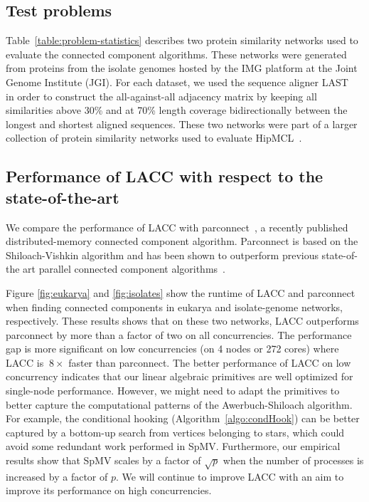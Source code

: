 \subsection{Test problems} 
Table~\ref{table:problem-statistics} describes two protein similarity networks used to evaluate the connected component algorithms.
These networks were generated from proteins from the isolate genomes hosted
by the IMG platform at the Joint Genome Institute (JGI). For each dataset, we used the sequence aligner LAST~\cite{kielbasa2011adaptive} in order to construct the all-against-all adjacency matrix
by keeping all similarities above 30\% and at 70\% length coverage bidirectionally between the longest and shortest aligned sequences. 
These two networks were part of a larger collection of protein similarity networks  used to evaluate HipMCL~\cite{hipmcl}. 








\subsection{Performance of LACC with respect to the state-of-the-art}
We compare the performance of LACC with parconnect~\cite{jain2017adaptive}, a recently published distributed-memory connected component algorithm. 
Parconnect is based on the Shiloach-Vishkin algorithm and has been shown to outperform previous state-of-the art parallel connected component algorithms~\cite{slota2014bfs}.

Figure \ref{fig:eukarya} and \ref{fig:isolates} show the runtime of LACC and parconnect when finding connected components in eukarya and isolate-genome networks, respectively.
These results shows that on these two networks, LACC outperforms parconnect by more than a factor of two on all concurrencies.
The performance gap is more significant on low concurrencies (on 4 nodes or 272 cores) where LACC is $~8\times$ faster than parconnect.
The better performance of LACC on low concurrency indicates that our linear algebraic primitives are well optimized for single-node performance.
However, we might need to adapt the primitives to better capture the computational patterns of the Awerbuch-Shiloach algorithm. 
For example, the conditional hooking (Algorithm~\ref{algo:condHook}) can be better captured by a bottom-up search from vertices belonging to stars, which could avoid some redundant work performed in SpMV.
Furthermore, our empirical results show that SpMV scales by a factor of $\sqrt{p}$ when the number of processes is increased by a factor of $p$.
We will continue to improve LACC with an aim to improve its performance on high concurrencies. 



